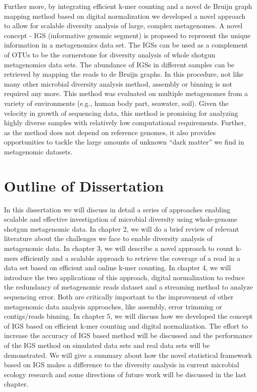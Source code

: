              Further    more, by integrating efficient k-mer counting and a
             novel de Bruijn graph mapping method based on digital
             normalization we developed a novel approach to allow for scalable
             diversity analysis of large, complex metagenomes.  A novel concept
             - IGS (informative genomic segment) is proposed to represent the
             unique information in a metagenomics data set. The IGSs can be
             used as a complement of OTUs to be the cornerstone for diversity
             analysis of whole shotgun metagenomics data sets. The abundance of
             IGSs in different samples can be retrieved by mapping the reads to
             de Bruijn graphs. In this procedure, not like many other microbial
             diversity analysis method, assembly or binning is not required any
             more. This method was evaluated on multiple metagenomes from a
             variety of environments (e.g., human body part, seawater, soil).
             Given the velocity in growth of sequencing data, this method is 
             promising for analyzing highly diverse samples with relatively low
             computational requirements. Further, as the method does not depend
             on reference genomes, it also provides opportunities to tackle the
             large amounts of unknown ``dark matter'' we 
             find in metagenomic datasets.


\section{Outline of Dissertation}

In this dissertation
we will discuss in detail a series of approaches enabling scalable
and effective investigation of microbial diversity using whole-genome shotgun
metagenomic data. In chapter 2, we will do a brief review of relevant
 literature about the challenges
we face to enable diversity analysis of metagenomic data. In chapter 3, we will 
describe a novel approach to count k-mers
efficiently and a scalable approach to retrieve the coverage of a read in a 
data set based on efficient and online k-mer counting. In chapter 4, we will  introduce 
the two applications of this approach, digital normalization to reduce the redundancy of metagenomic reads
dataset and a streaming method to analyze sequencing error. Both are critically important to 
the improvement of
other metagenomic data analysis approaches, like
assembly, error trimming or contigs/reads binning. In chapter 5, we will discuss
how we developed the concept 
of IGS based on efficient k-mer counting and digital normalization.  
The effort to increase the accuracy of IGS based method 
will be discussed and the performance of the IGS method on simulated data sets and
real data sets will be demonstrated. 
We will give a summary about how the novel statistical framework based on IGS makes
 a difference to the diversity analysis in current microbial ecology research and 
 some directions of future work will be discussed in the last chapter.


